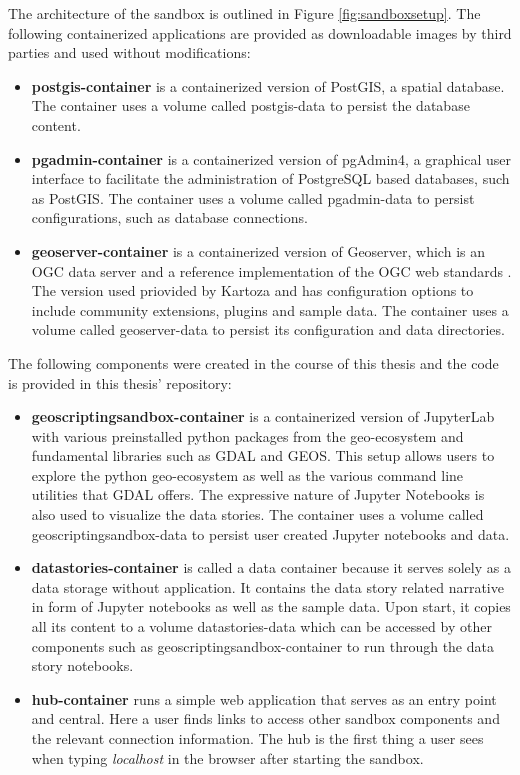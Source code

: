 \documentclass[11pt, a4paper, oneside, parskip=full-]{scrartcl}
\begin{document}
The architecture of the sandbox is outlined in Figure \ref{fig:sandboxsetup}.
The following containerized applications are provided as downloadable images by
third parties and used without modifications:

\begin{itemize}
  \item \textbf{postgis-container}\cite{postgis-container} is a containerized
  version of PostGIS, a spatial database. The container uses a volume called
  postgis-data to persist the database content.
  \item \textbf{pgadmin-container}\cite{pgadmin-container} is a containerized
  version of pgAdmin4, a graphical user interface to facilitate the
  administration of PostgreSQL based databases, such as PostGIS. The container
  uses a volume called pgadmin-data to persist configurations, such as database
  connections.
  \item \textbf{geoserver-container}\cite{geoserver-container} is a
  containerized version of Geoserver, which is an OGC data server and a
  reference implementation of the OGC web standards . The version used priovided
  by Kartoza and has configuration options to include community extensions,
  plugins and sample data. The container uses a volume called geoserver-data to
  persist its configuration and data directories.
\end{itemize}

The following components were created in the course of this thesis and the code
is provided in this thesis' repository\cite{osgeostacksandbox}:

\begin{itemize}
  \item \textbf{geoscriptingsandbox-container} is a containerized version of
  JupyterLab with various preinstalled python packages from the geo-ecosystem
  and fundamental libraries such as GDAL and GEOS\cite{geos}. This setup allows
  users to explore the python geo-ecosystem as well as the various command line
  utilities that GDAL offers. The expressive nature of Jupyter Notebooks is also
  used to visualize the data stories. The container uses a volume called
  geoscriptingsandbox-data to persist user created Jupyter notebooks and data.
  \item \textbf{datastories-container} is called a data container because it
  serves solely as a data storage without application. It contains the data
  story related narrative in form of Jupyter notebooks as well as the sample
  data. Upon start, it copies all its content to a volume datastories-data which
  can be accessed by other components such as geoscriptingsandbox-container to
  run through the data story notebooks.
  \item \textbf{hub-container} runs a simple web application that serves as an
  entry point and central. Here a user finds links to access other sandbox
  components and the relevant connection information. The hub is the first thing
  a user sees when typing \emph{localhost} in the browser after starting the
  sandbox.
\end{itemize}
\end{document}
